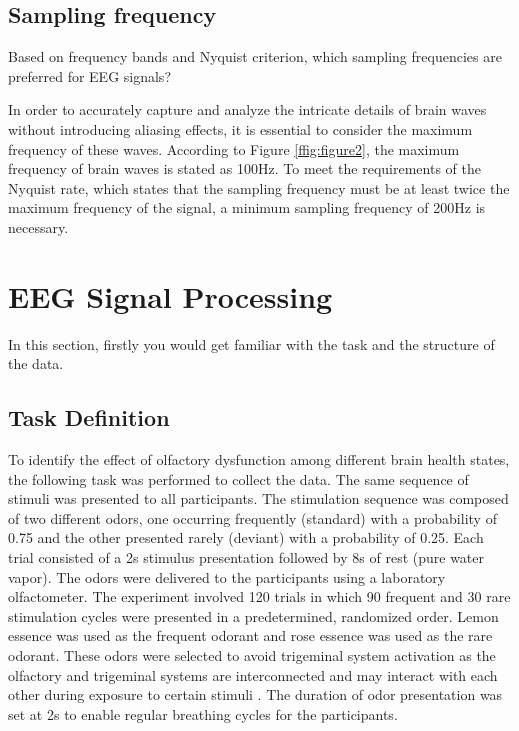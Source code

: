 \documentclass[12pt]{article}
\begin{document}
\newpage

\subsection{Sampling frequency}
Based on frequency bands and Nyquist criterion, which sampling frequencies are preferred for EEG signals?

\begin{qsolve}[]
	In order to accurately capture and analyze the intricate details of brain waves without introducing aliasing effects, it is essential to consider the maximum frequency of these waves.
	According to Figure \ref*{ffig:figure2}, the maximum frequency of brain waves is stated as 100Hz.
	To meet the requirements of the Nyquist rate, which states that the sampling frequency must be at least twice the maximum frequency of the signal, a minimum sampling frequency of 200Hz is necessary.
\end{qsolve}
\newpage

\section{EEG Signal Processing}
In this section, firstly you would get familiar with the task and the structure of the data.

\subsection{Task Definition}
\label{sec:sec3.1}
\cite{EEG-Dataset}
To identify the effect of olfactory dysfunction among different brain health states, the following task was performed to collect the data. The same sequence of stimuli was presented to all participants. The stimulation sequence was composed of two different odors, one occurring frequently (standard) with a probability of 0.75 and the other presented rarely (deviant) with a probability of 0.25. Each trial consisted of a 2s stimulus presentation followed by 8s of rest (pure water vapor). The odors were delivered to the participants using a laboratory olfactometer. The experiment involved 120 trials in which 90 frequent and 30 rare stimulation cycles were presented in a predetermined, randomized order. Lemon essence was used as the frequent odorant and rose essence was used as the rare odorant. These odors were selected to avoid trigeminal system activation as the olfactory and trigeminal systems are interconnected and may interact with each other during exposure to certain stimuli \cite{olfactory-trigeminal}. The duration of odor presentation was set at 2s to enable regular breathing cycles for the participants.
\end{document}
